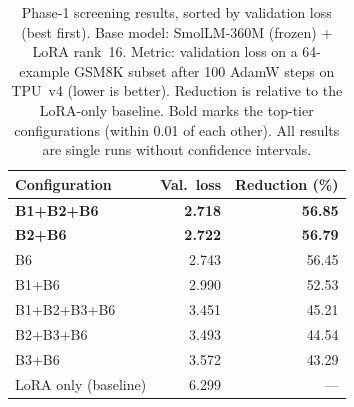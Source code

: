 \begin{table}[t]
\centering
\small
\begin{tabular}{lrr}
\toprule
Configuration & Val.\ loss & Reduction (\%) \\
\midrule
\textbf{B1+B2+B6} & \textbf{2.718} & \textbf{56.85} \\
\textbf{B2+B6} & \textbf{2.722} & \textbf{56.79} \\
B6 & 2.743 & 56.45 \\
B1+B6 & 2.990 & 52.53 \\
\midrule
B1+B2+B3+B6 & 3.451 & 45.21 \\
B2+B3+B6 & 3.493 & 44.54 \\
B3+B6 & 3.572 & 43.29 \\
\midrule
LoRA only (baseline) & 6.299 & --- \\
\bottomrule
\end{tabular}
\caption{Phase-1 screening results, sorted by validation loss (best first).
Base model: SmolLM-360M (frozen) + LoRA rank~16.
Metric: validation loss on a 64-example GSM8K subset after 100 AdamW steps on
TPU~v4 (lower is better).
Reduction is relative to the LoRA-only baseline.
Bold marks the top-tier configurations (within 0.01 of each other).
All results are single runs without confidence intervals.}
\label{tab:phase1-results}
\end{table}
